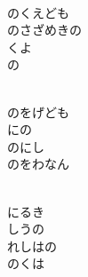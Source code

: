 \documentclass[10pt,b5j]{tarticle} %
\begin{document}
\begin{enumerate}
\begin{minipage}[c]{\blocksize}
        \vspace{\linespace}
        \item~\\
        のくえども\\
        のさざめきの\\
        くよ\\
        の
        
    \end{minipage}
    \begin{minipage}[c]{\blocksize}
        
        \vspace{\linespace}
        \item~\\
        のをげども\\
        にの\\
        のにし\\
        のをわなん
        
    \end{minipage}
    \begin{minipage}[c]{\blocksize}
        
        \vspace{\linespace}
        \item~\\
        にるき\\
        しうの\\
        れしはの\\
        のくは
    
    \end{minipage}
\end{enumerate} %
\end{document}
